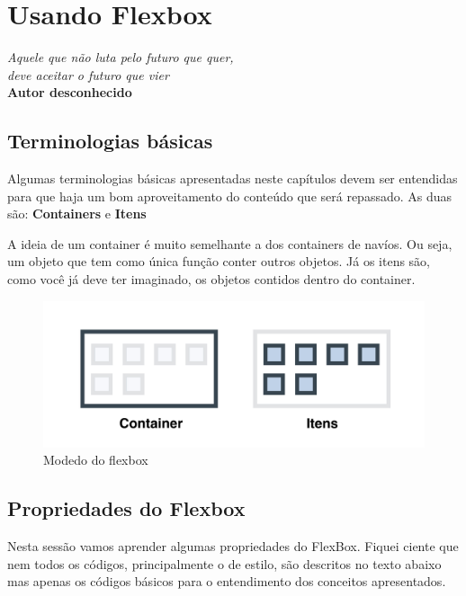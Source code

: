 \chapter{Usando Flexbox}

\begin{flushright}
  \textit{
    Aquele que não luta pelo futuro que quer, \\
    deve aceitar o futuro que vier
  } \\
  
  \textbf{Autor desconhecido}
\end{flushright}

\section{Terminologias básicas}

Algumas terminologias básicas apresentadas neste capítulos devem ser entendidas para que haja um bom aproveitamento do conteúdo que será repassado. As duas são: \textbf{Containers} e \textbf{Itens}

A ideia de um container é muito semelhante a dos containers de navíos. Ou seja, um objeto que tem como única função conter outros objetos. Já os itens são, como você já deve ter imaginado, os objetos contidos dentro do container. 

\begin{figure}[H]
  \centering
  \includegraphics[scale=0.12]{imagens/container-itens.jpeg}
  \caption{Modedo do flexbox}
  \label{fig:model-flexbox}
\end{figure}

\section{Propriedades do Flexbox}

Nesta sessão vamos aprender algumas propriedades do FlexBox. Fiquei ciente que nem todos os códigos, principalmente o de estilo, são descritos no texto abaixo mas apenas os códigos básicos para o entendimento dos conceitos apresentados.

